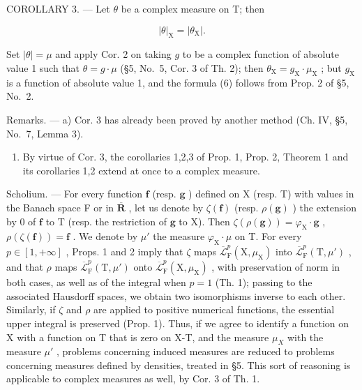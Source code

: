 COROLLARY 3. --- Let \(\theta\) be a complex measure on T; then

\[
| \theta | _ {\mathrm{X}} = | \theta_ {\mathrm{X}} |.\tag{6}
\]

Set \(|\theta| = \mu\) and apply Cor. 2 on taking \(g\) to be a complex function of absolute value 1 such that \(\theta = g \cdot \mu\) (§5, No.~5, Cor. 3 of Th. 2); then \(\theta_{\mathrm{X}} = g_{\mathrm{X}} \cdot \mu_{\mathrm{X}}\) ; but \(g_{\mathrm{X}}\) is a function of absolute value 1, and the formula (6) follows from Prop. 2 of §5, No.~2.

Remarks. --- a) Cor. 3 has already been proved by another method (Ch. IV, §5, No.~7, Lemma 3).

\begin{enumerate}
\def\labelenumi{\alph{enumi})}
\setcounter{enumi}{1}
\tightlist
\item
  By virtue of Cor. 3, the corollaries 1,2,3 of Prop. 1, Prop. 2, Theorem 1 and its corollaries 1,2 extend at once to a complex measure.
\end{enumerate}

Scholium. --- For every function \(\mathbf{f}\) (resp. \(\mathbf{g}\) ) defined on X (resp. T) with values in the Banach space F or in \(\overline{\mathbf{R}}\) , let us denote by \(\zeta(\mathbf{f})\) (resp. \(\rho(\mathbf{g})\) ) the extension by 0 of \(\mathbf{f}\) to T (resp. the restriction of \(\mathbf{g}\) to X). Then \(\zeta(\rho(\mathbf{g})) = \varphi_{\mathrm{X}} \cdot \mathbf{g}\) , \(\rho(\zeta(\mathbf{f})) = \mathbf{f}\) . We denote by \(\mu'\) the measure \(\varphi_{\mathrm{X}} \cdot \mu\) on T. For every \(p \in [1, +\infty]\) , Props. 1 and 2 imply that \(\zeta\) maps \(\overline{\mathcal{L}}_{\mathrm{F}}^{p}(\mathrm{X}, \mu_{\mathrm{X}})\) into \(\overline{\mathcal{L}}_{\mathrm{F}}^{p}(\mathrm{T}, \mu')\) , and that \(\rho\) maps \(\overline{\mathcal{L}}_{\mathrm{F}}^{p}(\mathrm{T}, \mu')\) onto \(\overline{\mathcal{L}}_{\mathrm{F}}^{p}(\mathrm{X}, \mu_{\mathrm{X}})\) , with preservation of norm in both cases, as well as of the integral when \(p = 1\) (Th. 1); passing to the associated Hausdorff spaces, we obtain two isomorphisms inverse to each other. Similarly, if \(\zeta\) and \(\rho\) are applied to positive numerical functions, the essential upper integral is preserved (Prop. 1). Thus, if we agree to identify a function on X with a function on T that is zero on X-T, and the measure \(\mu_{X}\) with the measure \(\mu'\) , problems concerning induced measures are reduced to problems concerning measures defined by densities, treated in §5. This sort of reasoning is applicable to complex measures as well, by Cor. 3 of Th. 1.
